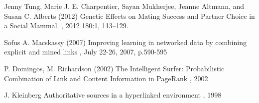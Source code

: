 \documentclass[twoside,twocolumn,paper=letter,fontsize=11pt]{article}
\begin{document}
\begin{thebibliography}{99} %

  Jenny Tung, Marie J. E. Charpentier, Sayan Mukherjee, Jeanne Altmann, and Susan C. Alberts (2012)
\newblock 
  Genetic Effects on Mating Success and Partner Choice in a Social Mammal.
, 2012 180:1, 113--129.

Sofus A. Macskassy (2007) 
\newblock
Improving learning in networked data by combining explicit and mined links
, July 22-26, 2007, p.590-595

P. Domingos, M. Richardson (2002) 
\newblock
 The Intelligent Surfer: Probabilistic Combination of Link and Content Information in PageRank
, 2002

J. Kleinberg
\newblock
Authoritative sources in a hyperlinked environment
, 1998
 
\end{thebibliography}

\end{document}
